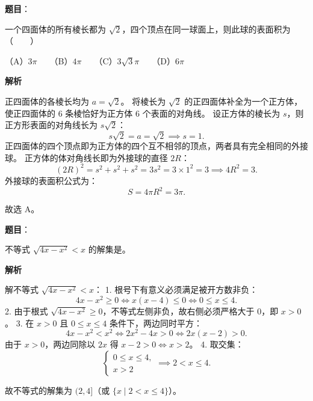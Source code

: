 \begin{answer}

\textbf{题目}：

一个四面体的所有棱长都为 $\sqrt{2}$，四个顶点在同一球面上，则此球的表面积为\mbox{（　　）}

（A）$3\pi$　　（B）$4\pi$　　（C）$3\sqrt{3}\pi$　　（D）$6\pi$

\textbf{解析}

正四面体的各棱长均为 $a = \sqrt{2}$。
将棱长为 $\sqrt{2}$ 的正四面体补全为一个正方体，使正四面体的 6 条棱恰好为正方体 6 个表面的对角线。
设正方体的棱长为 $s$，则正方形表面的对角线长为 $s\sqrt{2}$：
\nopagebreak[4]
\[s\sqrt{2} = a = \sqrt{2} \implies s = 1.\]
正四面体的四个顶点即为正方体的四个互不相邻的顶点，两者具有完全相同的外接球。
正方体的体对角线长即为外接球的直径 $2R$：
\nopagebreak[4]
\[(2R)^2 = s^2 + s^2 + s^2 = 3s^2 = 3 \times 1^2 = 3 \implies 4R^2 = 3.\]
外接球的表面积公式为：
\nopagebreak[4]
\[S = 4\pi R^2 = 3\pi.\]

故选 A。


\end{answer}
\begin{answer}

\textbf{题目}：

不等式 $\sqrt{4x - x^2} < x$ 的解集是\gkblank{}。

\textbf{解析}

解不等式 $\sqrt{4x - x^2} < x$：
1. 根号下有意义必须满足被开方数非负：
\nopagebreak[4]
\[4x - x^2 \ge 0 \iff x(x - 4) \le 0 \iff 0 \le x \le 4.\]
2. 由于根式 $\sqrt{4x - x^2} \ge 0$，不等式左侧非负，故右侧必须严格大于 0，即 $x > 0$。
3. 在 $x > 0$ 且 $0 \le x \le 4$ 条件下，两边同时平方：
\nopagebreak[4]
\[4x - x^2 < x^2 \iff 2x^2 - 4x > 0 \iff 2x(x - 2) > 0.\]
   由于 $x > 0$，两边同除以 $2x$ 得 $x - 2 > 0 \iff x > 2$。
4. 取交集：
\nopagebreak[4]
\[\begin{cases} 0 \le x \le 4, \\ x > 2 \end{cases} \implies 2 < x \le 4.\]

故不等式的解集为 $(2, 4]$（或 $\{x \mid 2 < x \le 4\}$）。

\gkanswer{答案：$(2, 4]$}

\end{answer}
